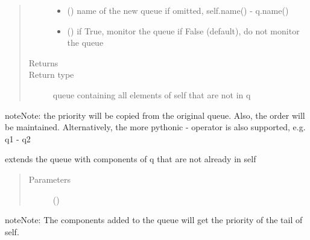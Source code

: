 \documentclass[letterpaper,10pt,english]{sphinxmanual}
\begin{document}
\begin{fulllineitems}
\begin{fulllineitems}
\begin{quote}
\begin{description}
\begin{itemize}
\item {} 
 () \textendash{} name of the  new queue 
if omitted, self.name() - q.name()

\item {} 
 () \textendash{} if True, monitor the queue 
if False (default), do not monitor the queue

\end{itemize}

\item[{Returns}] \leavevmode


\item[{Return type}] \leavevmode
queue containing all elements of self that are not in q

\end{description}\end{quote}

\begin{sphinxadmonition}{note}{Note:}
the priority will be copied from the original queue.
Also, the order will be maintained. 
Alternatively, the more pythonic - operator is also supported, e.g. q1 - q2
\end{sphinxadmonition}

\end{fulllineitems}


\begin{fulllineitems}
\label{\detokenize{Reference:salabim.Queue.extend}}
extends the queue with components of q that are not already in self
\begin{quote}\begin{description}
\item[{Parameters}] \leavevmode
{} (\sphinxstyleliteralemphasis{, }) \textendash{} 

\end{description}\end{quote}

\begin{sphinxadmonition}{note}{Note:}
The components added to the queue will get the priority of the tail of self.
\end{sphinxadmonition}


\end{fulllineitems}
\end{fulllineitems}
\end{document}

